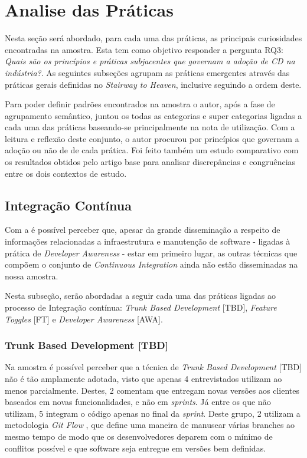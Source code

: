 \section{Analise das Práticas}

Nesta seção será abordado, para cada uma das práticas, as principais curiosidades encontradas na amostra. Esta tem como objetivo responder a pergunta RQ3: \emph{Quais são os princípios e práticas subjacentes que governam a adoção de CD na indústria?}. As seguintes subseções agrupam as práticas emergentes através das práticas gerais definidas no \emph{Stairway to Heaven}, inclusive seguindo a ordem deste.

Para poder definir padrões encontrados na amostra o autor, após a fase de agrupamento semântico, juntou os todas as categorias e super categorias ligadas a cada uma das práticas baseando-se principalmente na nota de utilização. Com a leitura e reflexão deste conjunto, o autor procurou por princípios que governam a adoção ou não de de cada prática. Foi feito também um estudo comparativo com os resultados obtidos pelo artigo base para analisar discrepâncias e congruências entre os dois contextos de estudo.

\subsection{Integração Contínua}

Com a  é possível perceber que, apesar da grande disseminação a respeito de informações relacionadas a infraestrutura e manutenção de software - ligadas à prática de \emph{Developer Awareness} - estar em primeiro lugar, as outras técnicas que compõem o conjunto de \emph{Continuous Integration} ainda não estão disseminadas na nossa amostra.

Nesta subseção, serão abordadas a seguir cada uma das práticas ligadas ao processo de Integração contínua: \emph{Trunk Based Development} [TBD], \emph{Feature Toggles} [FT] e \emph{Developer Awareness} [AWA].


\subsubsection{Trunk Based Development [TBD]}
Na amostra é possível perceber que a técnica de \emph{Trunk Based Development} [TBD] não é tão amplamente adotada, visto que apenas 4 entrevistados utilizam ao menos parcialmente. Destes, 2 comentam que entregam novas versões aos clientes baseados em novas funcionalidades, e não em \emph{sprints}. Já entre os que não utilizam, 5 integram o código apenas no final da \emph{sprint}. Deste grupo, 2 utilizam a metodologia \emph{Git Flow} \cite{gitFlow}, que define uma maneira de manusear várias branches ao mesmo tempo de modo que os desenvolvedores deparem com o mínimo de conflitos possível e que software seja entregue em versões bem definidas.

